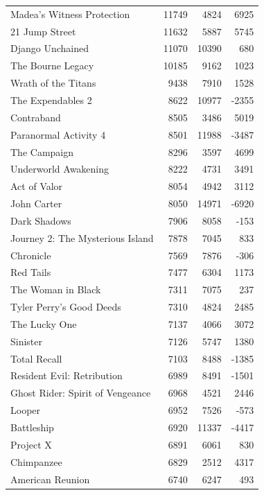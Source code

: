 \documentclass[10pt]{article}
\begin{document}
\begin{figure}[ht]
\begin{tabular}{l|r|r|r}
            Madea's Witness Protection & 11749 & 4824 & 6925 \\
            21 Jump Street & 11632 & 5887 & 5745 \\
            Django Unchained & 11070 & 10390 & 680 \\
            The Bourne Legacy & 10185 & 9162 & 1023 \\
            Wrath of the Titans & 9438 & 7910 & 1528 \\
            The Expendables 2 & 8622 & 10977 & -2355 \\
            Contraband & 8505 & 3486 & 5019 \\
            Paranormal Activity 4 & 8501 & 11988 & -3487 \\
            The Campaign & 8296 & 3597 & 4699 \\
            Underworld Awakening & 8222 & 4731 & 3491 \\
            Act of Valor & 8054 & 4942 & 3112 \\
            John Carter & 8050 & 14971 & -6920 \\
            Dark Shadows & 7906 & 8058 & -153 \\
            Journey 2: The Mysterious Island & 7878 & 7045 & 833 \\
            Chronicle & 7569 & 7876 & -306 \\
            Red Tails & 7477 & 6304 & 1173 \\
            The Woman in Black & 7311 & 7075 & 237 \\
            Tyler Perry's Good Deeds & 7310 & 4824 & 2485 \\
            The Lucky One & 7137 & 4066 & 3072 \\
            Sinister & 7126 & 5747 & 1380 \\
            Total Recall & 7103 & 8488 & -1385 \\
            Resident Evil: Retribution & 6989 & 8491 & -1501 \\
            Ghost Rider: Spirit of Vengeance & 6968 & 4521 & 2446 \\
            Looper & 6952 & 7526 & -573 \\
            Battleship & 6920 & 11337 & -4417 \\
            Project X & 6891 & 6061 & 830 \\
            Chimpanzee & 6829 & 2512 & 4317 \\
            American Reunion & 6740 & 6247 & 493 \\

\end{tabular}
\end{figure}
\end{document}

